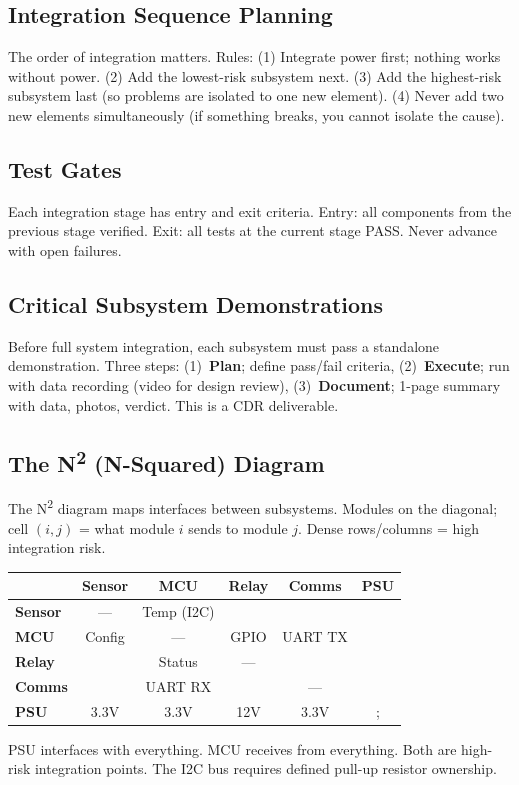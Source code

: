 \documentclass[11pt,letterpaper,twoside,openany]{book}
\begin{document}
\subsection{Integration Sequence Planning}
The order of integration matters. Rules: (1) Integrate power first; nothing works without power. (2) Add the lowest-risk subsystem next. (3) Add the highest-risk subsystem last (so problems are isolated to one new element). (4) Never add two new elements simultaneously (if something breaks, you cannot isolate the cause).

\subsection{Test Gates}
Each integration stage has entry and exit criteria. Entry: all components from the previous stage verified. Exit: all tests at the current stage PASS. Never advance with open failures.


\subsection{Critical Subsystem Demonstrations}
Before full system integration, each subsystem must pass a standalone demonstration. Three steps: (1)~\textbf{Plan}; define pass/fail criteria, (2)~\textbf{Execute}; run with data recording (video for design review), (3)~\textbf{Document}; 1-page summary with data, photos, verdict. This is a CDR deliverable.

\subsection{The N\texorpdfstring{\textsuperscript{2}}{2} (N-Squared) Diagram}
The N\textsuperscript{2} diagram maps interfaces between subsystems. Modules on the diagonal; cell $(i,j)$ = what module $i$ sends to module $j$. Dense rows/columns = high integration risk.

\begin{greenshieldbox}
\small
\begin{tabularx}{\textwidth}{l|c|c|c|c|c}
 & \textbf{Sensor} & \textbf{MCU} & \textbf{Relay} & \textbf{Comms} & \textbf{PSU} \\
\hline
\textbf{Sensor} & --- & Temp (I2C) & & & \\
\hline
\textbf{MCU} & Config & --- & GPIO & UART TX & \\
\hline
\textbf{Relay} & & Status & --- & & \\
\hline
\textbf{Comms} & & UART RX & & --- & \\
\hline
\textbf{PSU} & 3.3V & 3.3V & 12V & 3.3V &; \\
\end{tabularx}

PSU interfaces with everything. MCU receives from everything. Both are high-risk integration points. The I2C bus requires defined pull-up resistor ownership.
\end{greenshieldbox}
\end{document}
